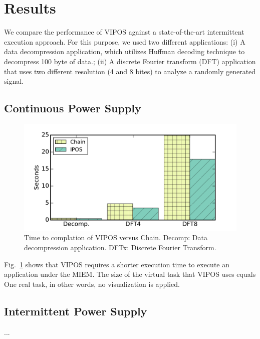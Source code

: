 \documentclass[sigconf,anonymous,review]{acmart}
\begin{document}
\section{Results}
We compare the performance of VIPOS against a state-of-the-art intermittent execution approach. For this purpose, we used two different applications: (i) A data decompression application, which utilizes Huffman decoding technique to decompress 100 byte of data.; (ii) A discrete Fourier transform (DFT) application that uses two different resolution (4 and 8 bites) to analyze a randomly generated signal. 

\subsection{Continuous Power Supply}

\begin{figure}[t]
	\centering
	\includegraphics[width=0.8\columnwidth]{figures/ipos_chain}
	\caption{Time to complation of VIPOS versus Chain. Decomp: Data decompression application. DFTx: Discrete Fourier Transform.}
	\label{fig:IPOSPerformance}
\end{figure}

Fig.~\ref{fig:IPOSPerformance} shows that VIPOS requires a shorter execution time to execute an application under the MIEM. The size of the virtual task that VIPOS uses equals One real task, in other words, no visualization is applied.



\subsection{Intermittent Power Supply}
...



\end{document}
